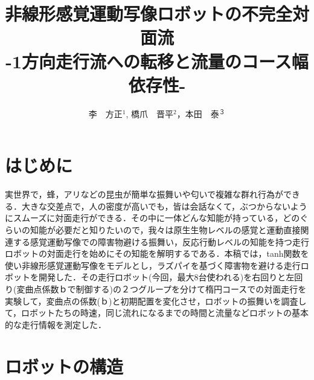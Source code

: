 \documentclass[twocolumn]{jarticle} %
\title{%
非線形感覚運動写像ロボットの不完全対面流\\
{\Large -1方向走行流への転移と流量のコース幅依存性-}
}
\author{%
李　方正$^1$, 橋爪　晋平$^2$，本田　泰$^３$
}
\affiliation{%
$^1$ 室蘭工業大学大学院　工学研究科　情報電子工学系専攻\\
$^2$ 室蘭工業大学　工学部　情報電子工学系学科\\
$^3$ 室蘭工業大学大学院　しくみ解明系領域
}
\begin{document}
\maketitle

\section{はじめに}
実世界で，蜂，アリなどの昆虫が簡単な振舞いや匂いで複雑な群れ行為ができる．大きな交差点で，人の密度が高いでも，皆は会話なくて，ぶつからないようにスムーズに対面走行ができる．その中に一体どんな知能が持っている，どのぐらいの知能が必要だと知りたいので，我々は原生生物レベルの感覚と運動直接関連する感覚運動写像での障害物避ける振舞い，反応行動レベルの知能を持つ走行ロボットの対面走行を始めにその知能を解明するである．本稿では，tanh関数を使い非線形感覚運動写像をモデルとし，ラズパイを基づく障害物を避ける走行ロボットを開発した．その走行ロボット(今回，最大8台使われる)を右回りと左回り(変曲点係数ｂで制御する)の２つグループを分けて楕円コースでの対面走行を実験して，変曲点の係数(ｂ)と初期配置を変化させ，ロボットの振舞いを調査して，ロボットたちの時速，同じ流れになるまでの時間と流量などロボットの基本的な走行情報を測定した．
\section{ロボットの構造}
\end{document}
